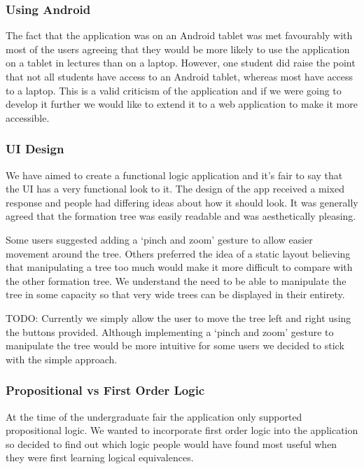 \documentclass{report}
\begin{document}
\subsubsection{Using Android}

The fact that the application was on an Android tablet was met favourably with most of the users agreeing that they would be more likely to use the application on a tablet in lectures than on a laptop. However, one student did raise the point that not all students have access to an Android tablet, whereas most have access to a laptop. This is a valid criticism of the application and if we were going to develop it further we would like to extend it to a web application to make it more accessible.

\subsubsection{UI Design}

We have aimed to create a functional logic application and it's fair to say that the UI has a very functional look to it. The design of the app received a mixed response and people had differing ideas about how it should look. It was generally agreed that the formation tree was easily readable and was aesthetically pleasing. 

Some users suggested adding a `pinch and zoom' gesture to allow easier movement around the tree. Others preferred the idea of a static layout believing that manipulating a tree too much would make it more difficult to compare with the other formation tree. We understand the need to be able to manipulate the tree in some capacity so that very wide trees can be displayed in their entirety. 

TODO: Currently we simply allow the user to move the tree left and right using the buttons provided. Although implementing a `pinch and zoom' gesture to manipulate the tree would be more intuitive for some users we decided to stick with the simple approach.

\subsubsection{Propositional vs First Order Logic}

At the time of the undergraduate fair the application only supported propositional logic. We wanted to incorporate first order logic into the application so decided to find out which logic people would have found most useful when they were first learning logical equivalences.
\end{document}
